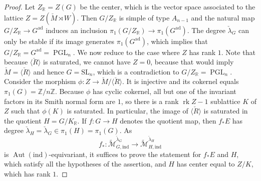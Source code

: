 \documentclass[10pt, a4paper]{amsart}
\theoremstyle{definition}
\theoremstyle{myitemstyle}
\newcommand{\R}{\mathbb{R}}
\newcommand{\Z}{\mathbb{Z}}
\newcommand{\Mcheck}{{\check{M}}}
\newcommand{\lambdacheck}{\check{\lambda}}
\newcommand{\Rcheck}{\check{R}}
\newcommand{\wmc}[1]{{\widetilde{\mathcal{#1}}}}
\DeclareMathOperator{\Aut}{Aut}
\DeclareMathOperator{\PGL}{PGL}
\DeclareMathOperator{\rk}{rk}
\newcommand{\SL}{{\mathrm{SL}}}
\newcommand{\ind}{\mathrm{ind}}
\newcommand{\ad}{{\mathrm{ad}}}
\begin{document}
\begin{proof}
Let $Z_\R=Z(G)$ be the center, which is the vector space associated to the lattice $Z=Z(\Mcheck\rtimes W)$. Then $G/Z_\R$ is simple of type $A_{n-1}$ and the natural map $G/Z_\R\to G^\ad$ induces an inclusion $\pi_1(G/Z_\R)\to \pi_1(G^\ad)$. The degree $\lambdacheck_G$ can only be stable if its image generates $\pi_1(G^\ad)$, which implies that $G/Z_\R=G^\ad=\PGL_n$. We now reduce to the case where $Z$ has rank $1$. Note that because $\langle \Rcheck\rangle$ is saturated, we cannot have $Z=0$, because that would imply $\Mcheck=\langle \Rcheck\rangle$ and hence $G=\SL_n$, which is a contradiction to $G/Z_\R=\PGL_n$. Consider the morphism $\phi\colon Z\to \Mcheck/\langle\Rcheck\rangle$. It is injective and its cokernel equals $\pi_1(G)=\Z/n\Z$. Because $\phi$ has cyclic cokernel, all but one of the invariant factors in its Smith normal form are $1$, so there is a rank $\rk Z-1$ sublattice $K$ of $Z$ such that $\phi(K)$ is saturated. In particular, the image of $\langle \Rcheck\rangle$ is saturated in the quotient $H=G/K_\R$. If $f\colon G\to H$ denotes the quotient map, then $f_*E$ has degree $\lambdacheck_H=\lambdacheck_G\in \pi_1(H)=\pi_1(G)$. As 
\[
    f_*\colon \wmc M_{G,\ind}^{\lambdacheck_G}\longrightarrow \wmc M_{H,\ind}^{\lambdacheck_H}
\]
is $\Aut(\ind)$-equivariant, it suffices to prove the statement for $f_*E$ and $H$, which satisfy all the hypotheses of the assertion, and $H$ has center equal to $Z/K$, which has rank $1$. 


\end{proof}
\end{document}
